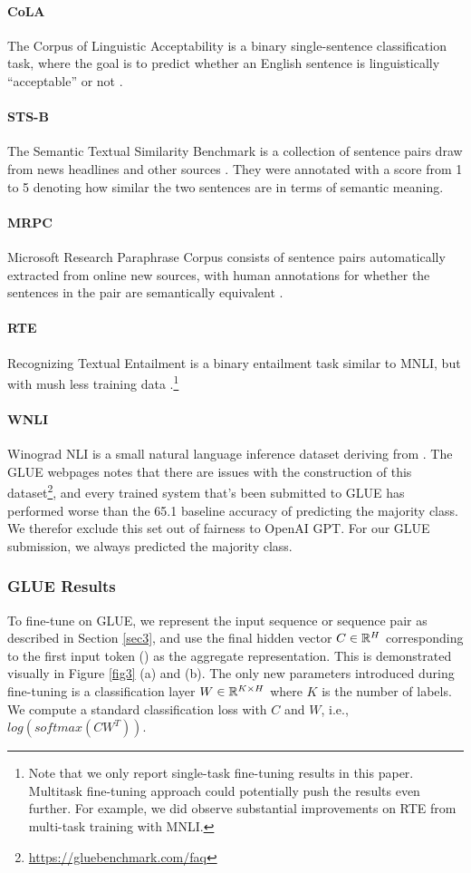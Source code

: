 	\paragraph{CoLA} The Corpus of Linguistic Acceptability is a binary single-sentence classification task, where the goal is to predict whether an English sentence is linguistically ``acceptable'' or not \citep{Warstadt2018}.
	\paragraph{STS-B} The Semantic Textual Similarity Benchmark is a collection of sentence pairs draw from news headlines and other sources \citep{Daniel2017}. They were annotated with a score from 1 to 5 denoting how similar the two sentences are in terms of semantic meaning.
	\paragraph{MRPC} Microsoft Research Paraphrase Corpus consists of sentence pairs automatically extracted from online new sources, with human annotations for whether the sentences in the pair are semantically equivalent \citep{William2005}.
	\paragraph{RTE} Recognizing Textual Entailment is a binary entailment task similar to MNLI, but with mush less training data \citep{Luisa2009}.\footnote{Note that we only report single-task fine-tuning results in this paper. Multitask fine-tuning approach could potentially push the results even further. For example, we did observe substantial improvements on RTE from multi-task training with MNLI.}
	\paragraph{WNLI} Winograd NLI is a small natural language inference dataset deriving from \citep{Hector2011}. The GLUE webpages notes that there are issues with the construction of this dataset\footnote{\url{https://gluebenchmark.com/faq}}, and every trained system that's been submitted to GLUE has performed worse than the 65.1 baseline accuracy of predicting the majority class. We therefor exclude this set out of fairness to OpenAI GPT. For our GLUE submission, we always predicted the majority class.

	
		\subsubsection{GLUE Results} \label{sec4.1.1}
		To fine-tune on GLUE, we represent the input sequence or sequence pair as described in Section \ref{sec3}, and use the final hidden vector $C \in \mathbb{R}^H $ corresponding to the first input token ({\selectfont[CLS]}) as the aggregate representation. This is demonstrated visually in Figure \ref{fig3} (a) and (b). The only new parameters introduced during fine-tuning is a classification layer $W \in \mathbb{R}^{K \times H}$ where $K$ is the number of labels. We compute a standard classification loss with $C$ and $W$, i.e., $log(softmax(CW^T))$.
		
